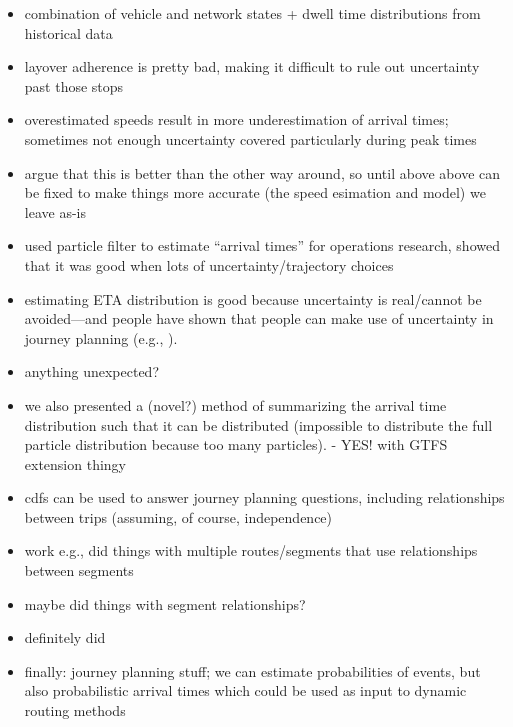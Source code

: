 \begin{itemize}
  \item combination of vehicle and network states + dwell time distributions from historical data
  \item layover adherence is pretty bad, making it difficult to rule out uncertainty past those stops
  \item overestimated speeds result in more underestimation of arrival times; sometimes not enough uncertainty covered particularly during peak times
  \item argue that this is better than the other way around, so until above above can be fixed to make things more accurate (the speed esimation and model) we leave as-is
  \item \citet{Hans_2015} used particle filter to estimate ``arrival times'' for operations research, showed that it was good when lots of uncertainty/trajectory choices

  \item estimating ETA distribution is good because uncertainty is real/cannot be avoided---and people have shown that people can make use of uncertainty in journey planning (e.g., \citet{Fernandes_2018,Mazloumi_2011}).

  \item anything unexpected?

  \item we also presented a (novel?) method of summarizing the arrival time distribution such that it can be distributed (impossible to distribute the full particle distribution because too many particles).  - YES! with GTFS extension thingy

  \item \glspl{cdf} can be used to answer journey planning questions, including relationships between trips (assuming, of course, independence)

  \item work e.g., \citet{Yu_2011,Yin_2017} did things with multiple routes/segments that use relationships between segments
  \item \citet{Celan_2017,Celan_2018} maybe did things with segment relationships?
  \item \citet{Julio_2016} definitely did

  \item finally: journey planning stuff; we can estimate probabilities of events, but also probabilistic arrival times which could be used as input to dynamic routing methods \citep{Berczi_2017}
\end{itemize}


